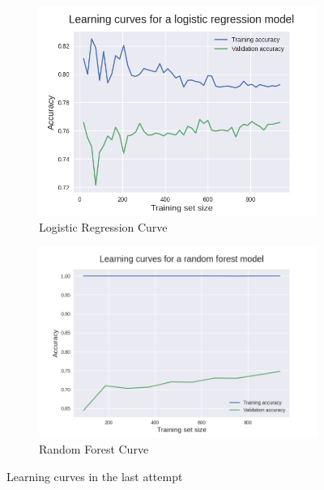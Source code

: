 \documentclass[12pt, conference]{IEEEtran}
\begin{document}
\begin{figure}[t]
    \centering
    \begin{subfigure}[b]{.5\linewidth}
        \centering
        \includegraphics[width=\linewidth]{resources/learning_curve_in-out_features_bitrate_log_regr.png}
        \caption{Logistic Regression Curve}
        \label{fig:learning-curves-last-attempt-randfor}
    \end{subfigure}%
    \begin{subfigure}[b]{.5\linewidth}
        \centering
        \includegraphics[width=\linewidth]{resources/learning_curve_in-out_features_bitrate_randfor.png}
        \caption{Random Forest Curve}
        \label{fig:learning-curves-last-attempt-logreg}
    \end{subfigure}
    \caption{Learning curves in the last attempt}
    \label{fig:learning-curves-last-attempt}
\end{figure}
\end{document}
